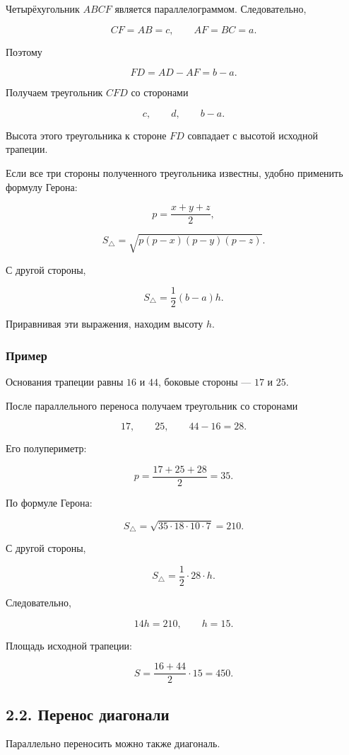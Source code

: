 \documentclass[a4paper,12pt]{article}
\begin{document}
Четырёхугольник $ABCF$ является параллелограммом. Следовательно,

\[
CF=AB=c,
\qquad
AF=BC=a.
\]

Поэтому

\[
FD=AD-AF=b-a.
\]

Получаем треугольник $CFD$ со сторонами

\[
c,\qquad d,\qquad b-a.
\]

Высота этого треугольника к стороне $FD$ совпадает с высотой исходной
трапеции.

Если все три стороны полученного треугольника известны, удобно применить
формулу Герона:

\[
p=\frac{x+y+z}{2},
\]

\[
S_{\triangle}
=
\sqrt{
p(p-x)(p-y)(p-z)
}.
\]

С другой стороны,

\[
S_{\triangle}
=
\frac12(b-a)h.
\]

Приравнивая эти выражения, находим высоту $h$.

\subsubsection*{Пример}

Основания трапеции равны $16$ и $44$, боковые стороны --- $17$ и $25$.

После параллельного переноса получаем треугольник со сторонами

\[
17,\qquad 25,\qquad 44-16=28.
\]

Его полупериметр:

\[
p=\frac{17+25+28}{2}=35.
\]

По формуле Герона:

\[
S_{\triangle}
=
\sqrt{
35\cdot18\cdot10\cdot7
}
=
210.
\]

С другой стороны,

\[
S_{\triangle}
=
\frac12\cdot28\cdot h.
\]

Следовательно,

\[
14h=210,
\qquad
h=15.
\]

Площадь исходной трапеции:

\[
S
=
\frac{16+44}{2}\cdot15
=
450.
\]

\subsection*{2.2. Перенос диагонали}

Параллельно переносить можно также диагональ.
\end{document}

